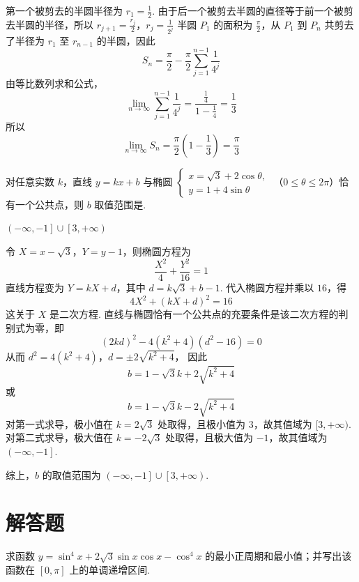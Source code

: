\begin{solution}
第一个被剪去的半圆半径为 \(r_1=\frac12\). 由于后一个被剪去半圆的直径等于前一个被剪去半圆的半径，所以
\(r_{j+1}=\frac{r_j}{2}\)，\(r_j=\frac{1}{2^j}\)
半圆 \(P_1\) 的面积为 \(\frac{\pi}{2}\)，从 \(P_1\) 到 \(P_n\) 共剪去了半径为 \(r_1\) 至 \(r_{n-1}\) 的半圆，因此
\[
S_n=\frac{\pi}{2}-\frac{\pi}{2}\sum_{j=1}^{n-1}\frac{1}{4^j}\]
由等比数列求和公式，
\[
\lim_{n\to\infty}\sum_{j=1}^{n-1}\frac{1}{4^j}=\frac{\frac14}{1-\frac14}=\frac13\]
所以
\[
\lim_{n\to\infty}S_n=\frac{\pi}{2}\left(1-\frac13\right)=\frac{\pi}{3}\]
\end{solution}

\begin{problem}
对任意实数 \(k\)，直线 \(y=kx+b\) 与椭圆
\(\begin{cases}
x=\sqrt{3}+2\cos\theta,\\
y=1+4\sin\theta
\end{cases}\)
（\(0\leqslant\theta\leqslant2\pi\)）恰有一个公共点，则 \(b\) 取值范围是\fillinblank{}.
\end{problem}

\begin{answer}
\(\left(-\infty,-1\right]\cup\left[3,+\infty\right)\)
\end{answer}

\begin{solution}
令 \(X=x-\sqrt{3}\)，\(Y=y-1\)，则椭圆方程为
\[
\frac{X^2}{4}+\frac{Y^2}{16}=1\]
直线方程变为 \(Y=kX+d\)，其中 \(d=k\sqrt{3}+b-1\). 代入椭圆方程并乘以 \(16\)，得
\[
4X^2+(kX+d)^2=16\]
这关于 \(X\) 是二次方程. 直线与椭圆恰有一个公共点的充要条件是该二次方程的判别式为零，即
\[
\left(2kd\right)^2-4\left(k^2+4\right)\left(d^2-16\right)=0
\]
从而
\(d^2=4\left(k^2+4\right)\)，\(d=\pm2\sqrt{k^2+4}\)，
因此
\[
b=1-\sqrt{3}k+2\sqrt{k^2+4}
\]
或
\[
b=1-\sqrt{3}k-2\sqrt{k^2+4}\]
对第一式求导，极小值在 \(k=2\sqrt{3}\) 处取得，且极小值为 \(3\)，故其值域为 \([3,+\infty)\). 对第二式求导，极大值在 \(k=-2\sqrt{3}\) 处取得，且极大值为 \(-1\)，故其值域为 \(\left(-\infty,-1\right]\).

综上，\(b\) 的取值范围为 \(\left(-\infty,-1\right]\cup\left[3,+\infty\right)\).
\end{solution}

\section{解答题}
\begin{problem}
求函数 \(y=\sin^4x+2\sqrt{3}\sin x\cos x-\cos^4x\) 的最小正周期和最小值；并写出该函数在 \([0,\pi]\) 上的单调递增区间.
\end{problem}

